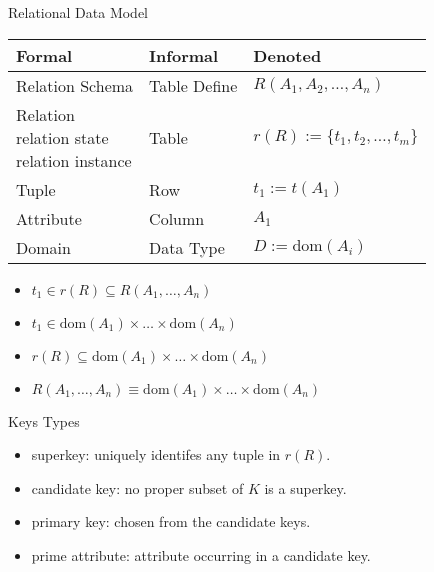 \documentclass[a4paper]{article}
\begin{document}
\begin{cheatsheetblock}{Relational Data Model}
    \begin{tabularx}{\linewidth}{|X|X|X|}
        \hline
        \textbf{Formal} & \textbf{Informal} & \textbf{Denoted}                             \\
        \hline
        Relation Schema & Table Define      & $R(A_1, A_2,\allowbreak\dots, A_n)$          \\
        \hline
        \makecell[l]{Relation                                                              \\relation state\\relation instance}
                        & Table             & $r(R) := \{t_1, t_2\allowbreak,\dots, t_m\}$ \\
        \hline
        Tuple           & Row               & $t_1:=t(A_1)$                                \\
        \hline
        Attribute       & Column            & $A_1$                                        \\
        \hline
        Domain          & Data Type         & $D:=\mathrm{dom}(A_i)$                       \\
        \hline
    \end{tabularx}
    \begin{itemize}[topsep=0pt, noitemsep, ]
        \item $t_1 \in r(R) \subseteq R(A_1, \dots, A_n)$
        \item $t_1 \in \mathrm{dom}(A_1) \times \dots \times \mathrm{dom}(A_n)$
        \item $r(R) \subseteq \mathrm{dom}(A_1) \times \dots \times \mathrm{dom}(A_n)$
        \item $R(A_1, \dots, A_n) \equiv \mathrm{dom}(A_1) \times \dots \times \mathrm{dom}(A_n)$
    \end{itemize}
\end{cheatsheetblock}

\begin{cheatsheetblock}{Keys}
    Types
    \begin{itemize}
        \item superkey: uniquely identifes any tuple in $r(R)$.
        \item candidate key: no proper subset of $K$ is a superkey.
        \item primary key: chosen from the candidate keys.
        \item prime attribute: attribute occurring in a candidate key.
    \end{itemize}
\end{cheatsheetblock}
\end{document}
